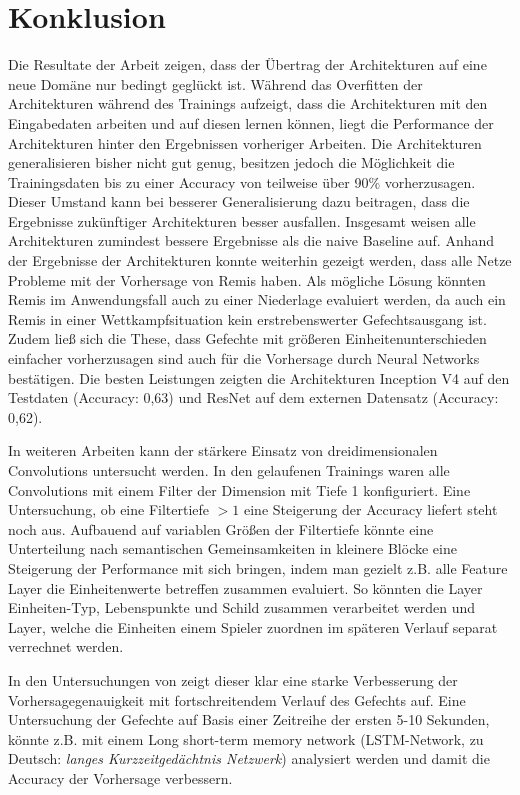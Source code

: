 \section{Konklusion}

Die Resultate der Arbeit zeigen, dass der Übertrag der Architekturen auf eine neue Domäne nur bedingt geglückt ist. Während das Overfitten der Architekturen während des Trainings aufzeigt, dass die Architekturen mit den Eingabedaten arbeiten und auf diesen lernen können, liegt die Performance der Architekturen hinter den Ergebnissen vorheriger Arbeiten. Die Architekturen generalisieren bisher nicht gut genug, besitzen jedoch die Möglichkeit die Trainingsdaten bis zu einer Accuracy von teilweise über 90\% vorherzusagen. Dieser Umstand kann bei besserer Generalisierung dazu beitragen, dass die Ergebnisse zukünftiger Architekturen besser ausfallen. Insgesamt weisen alle Architekturen zumindest bessere Ergebnisse als die naive Baseline auf. Anhand der Ergebnisse der Architekturen konnte weiterhin gezeigt werden, dass alle Netze Probleme mit der Vorhersage von Remis haben. Als mögliche Lösung könnten Remis im Anwendungsfall auch zu einer Niederlage evaluiert werden, da auch ein Remis in einer Wettkampfsituation kein erstrebenswerter Gefechtsausgang ist. Zudem ließ sich die These, dass Gefechte mit größeren Einheitenunterschieden einfacher vorherzusagen sind auch für die Vorhersage durch Neural Networks bestätigen. Die besten Leistungen zeigten die Architekturen Inception V4 auf den Testdaten (Accuracy: 0,63) und ResNet auf dem externen Datensatz (Accuracy: 0,62).

In weiteren Arbeiten kann der stärkere Einsatz von dreidimensionalen Convolutions untersucht werden. In den gelaufenen Trainings waren alle Convolutions mit einem Filter der Dimension mit Tiefe 1 konfiguriert. Eine Untersuchung, ob eine Filtertiefe $>1$ eine Steigerung der Accuracy liefert steht noch aus. Aufbauend auf variablen Größen der Filtertiefe könnte   eine Unterteilung nach semantischen Gemeinsamkeiten in kleinere Blöcke eine Steigerung der Performance mit sich bringen, indem man gezielt z.B. alle Feature Layer die Einheitenwerte betreffen zusammen evaluiert. So könnten die Layer Einheiten-Typ, Lebenspunkte und Schild zusammen verarbeitet werden und Layer, welche die Einheiten einem Spieler zuordnen im späteren Verlauf separat verrechnet werden.

In den Untersuchungen von \textcite{SnchezRuizGranados2015PredictingTO} zeigt dieser klar eine starke Verbesserung der Vorhersagegenauigkeit mit fortschreitendem Verlauf des Gefechts auf. Eine Untersuchung der Gefechte auf Basis einer Zeitreihe der ersten 5-10 Sekunden, könnte z.B. mit einem Long short-term memory network (LSTM-Network, zu Deutsch: \textit{langes Kurzzeitgedächtnis Netzwerk}) analysiert werden und damit die Accuracy der Vorhersage verbessern. 

